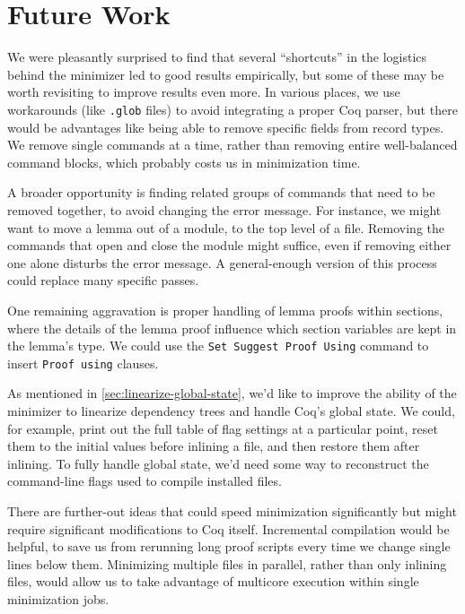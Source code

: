 \documentclass[a4paper,USenglish,cleveref,autoref,thm-restate]{lipics-v2021}
\begin{document}
\section{Future Work}\label{sec:future-work}

We were pleasantly surprised to find that several ``shortcuts'' in the logistics behind the minimizer led to good results empirically, but some of these may be worth revisiting to improve results even more.
In various places, we use workarounds (like \texttt{.glob} files) to avoid integrating a proper Coq parser, but there would be advantages like being able to remove specific fields from record types.
We remove single commands at a time, rather than removing entire well-balanced command blocks, which probably costs us in minimization time.

A broader opportunity is finding related groups of commands that need to be removed together, to avoid changing the error message.
For instance, we might want to move a lemma out of a module, to the top level of a file.
Removing the commands that open and close the module might suffice, even if removing either one alone disturbs the error message.
A general-enough version of this process could replace many specific passes. %

One remaining aggravation is proper handling of lemma proofs within sections, where the details of the lemma proof influence which section variables are kept in the lemma's type.
We could use the \verb|Set Suggest Proof Using| command to insert \verb|Proof using| clauses.

As mentioned in \autoref{sec:linearize-global-state}, we'd like to improve the ability of the minimizer to linearize dependency trees and handle Coq's global state.
We could, for example, print out the full table of flag settings at a particular point, reset them to the initial values before inlining a file, and then restore them after inlining.
To fully handle global state, we'd need some way to reconstruct the command-line flags used to compile installed files.

There are further-out ideas that could speed minimization significantly but might require significant modifications to Coq itself.
Incremental compilation would be helpful, to save us from rerunning long proof scripts every time we change single lines below them.
Minimizing multiple files in parallel, rather than only inlining files, would allow us to take advantage of multicore execution within single minimization jobs.
\end{document}
